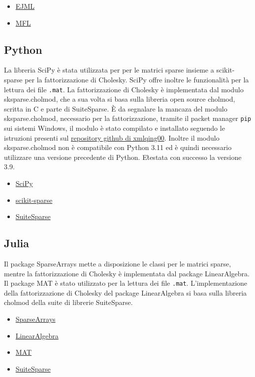 \documentclass[a4paper, 12pt]{article}
\begin{document}
\begin{itemize}
\item \href{http://ejml.org/}{EJML}
\item \href{https://github.com/HebiRobotics/MFL}{MFL}
\end{itemize}

\subsection{Python}
La libreria SciPy è stata utilizzata per per le matrici sparse insieme a
scikit-sparse per la fattorizzazione di Cholesky.
SciPy offre inoltre le funzionalità per la lettura dei file \texttt{.mat}.
La fattorizzazione di Cholesky è implementata dal modulo sksparse.cholmod,
che a sua volta si basa sulla libreria open source cholmod, scritta in C e
parte di SuiteSparse.
\`E da segnalare la mancaza del modulo sksparse.cholmod, necessario per la
fattorizzazione, tramite il packet manager \texttt{pip} sui sistemi Windows,
il modulo è stato compilato e installato seguendo le istruzioni presenti sul
\href{https://github.com/xmlyqing00/Cholmod-Scikit-Sparse-Windows}
{repository github di xmlqing00}.
Inoltre il modulo sksparse.cholmod non è compatibile con Python 3.11
ed è quindi necessario utilizzare una versione precedente di Python.
E\` testata con successo la versione 3.9.

\begin{itemize}
\item \href{https://www.scipy.org/}{SciPy}
\item \href{https://github.com/scikit-sparse/scikit-sparse} {scikit-sparse}
\item \href{http://suitesparse.com}{SuiteSparse}
\end{itemize}

\subsection{Julia}
Il package SparseArrays mette a disposizione le classi per le matrici sparse,
mentre la fattorizzazione di Cholesky è implementata dal package LinearAlgebra.
Il package MAT è stato utilizzato per la lettura dei file \texttt{.mat}.
L'implementazione della fattorizzazione di Cholesky del package LinearAlgebra
si basa sulla libreria cholmod della suite di librerie SuiteSparse.

\begin{itemize}
\item \href{https://docs.julialang.org/en/v1/stdlib/SparseArrays/}{SparseArrays}
\item \href{https://docs.julialang.org/en/v1/stdlib/LinearAlgebra/}
{LinearAlgebra}
\item \href{https://github.com/JuliaIO/MAT.jl}{MAT}
\item \href{http://suitesparse.com}{SuiteSparse}
\end{itemize}
\end{document}
